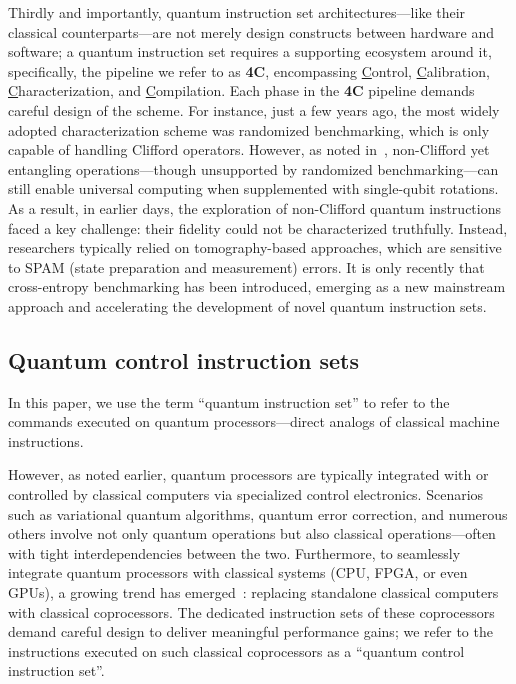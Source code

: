 \documentclass[a4paper,onecolumn,11pt,unpublished]{quantumarticle}
\begin{document}
Thirdly and importantly, quantum instruction set architectures---like their classical counterparts---are not merely design constructs between hardware and software; a quantum instruction set requires a supporting ecosystem around it, specifically, the pipeline we refer to as \textbf{4C}, encompassing \underline{C}ontrol, \underline{C}alibration, \underline{C}haracterization, and \underline{C}ompilation. Each phase in the \textbf{4C} pipeline demands careful design of the scheme. For instance, just a few years ago, the most widely adopted characterization scheme was randomized benchmarking, which is only capable of handling Clifford operators. However, as noted in~\cite{harrow2008exact}, non-Clifford yet entangling operations---though unsupported by randomized benchmarking---can still enable universal computing when supplemented with single-qubit rotations.
As a result, in earlier days, the exploration of non-Clifford quantum instructions faced a key challenge: their fidelity could not be characterized truthfully. Instead, researchers typically relied on tomography-based approaches, which are sensitive to SPAM (state preparation and measurement) errors. It is only recently that cross-entropy benchmarking has been introduced, emerging as a new mainstream approach and accelerating the development of novel quantum instruction sets.

\subsection{Quantum control instruction sets}\label{subsec:qcis}

In this paper, we use the term ``quantum instruction set'' to refer to the commands executed on quantum processors---direct analogs of classical machine instructions.

However, as noted earlier, quantum processors are typically integrated with or controlled by classical computers via specialized control electronics. Scenarios such as variational quantum algorithms, quantum error correction, and numerous others involve not only quantum operations but also classical operations---often with tight interdependencies between the two. Furthermore, to seamlessly integrate quantum processors with classical systems (CPU, FPGA, or even GPUs), a growing trend has emerged~\cite{fuExperimentalMicroarchitectureSuperconducting2017,fuEQASMExecutableQuantum2019a,zhouHiMAHierarchicalQuantum2024,zhangClassicalArchitectureDigital2024,zettles262DesignConsiderations2022}: replacing standalone classical computers with classical coprocessors. The dedicated instruction sets of these coprocessors demand careful design to deliver meaningful performance gains; we refer to the instructions executed on such classical coprocessors as a ``quantum control instruction set''. 
\end{document}
